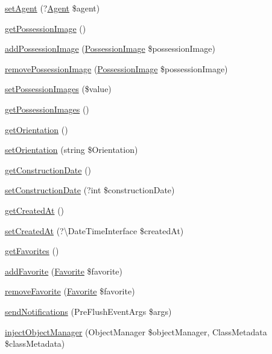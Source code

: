 \begin{DoxyCompactItemize}
\mbox{\hyperlink{class_app_1_1_entity_1_1_possession_a07e2e618472a00aaca5d813ee52abdac}{set\+Agent}} (?\mbox{\hyperlink{class_app_1_1_entity_1_1_agent}{Agent}} \$agent)
\item 
\mbox{\hyperlink{class_app_1_1_entity_1_1_possession_a9862c73c192fcf2032704752a1bfaccf}{get\+Possession\+Image}} ()
\item 
\mbox{\hyperlink{class_app_1_1_entity_1_1_possession_aeebbcaa3f823eb078d8a3f70082eb686}{add\+Possession\+Image}} (\mbox{\hyperlink{class_app_1_1_entity_1_1_possession_image}{Possession\+Image}} \$possession\+Image)
\item 
\mbox{\hyperlink{class_app_1_1_entity_1_1_possession_a61c52551493a4e8ae6bd5a11b44bdb65}{remove\+Possession\+Image}} (\mbox{\hyperlink{class_app_1_1_entity_1_1_possession_image}{Possession\+Image}} \$possession\+Image)
\item 
\mbox{\hyperlink{class_app_1_1_entity_1_1_possession_a4adfc8fe6a8861e0d2eb25c0388649fc}{set\+Possession\+Images}} (\$value)
\item 
\mbox{\hyperlink{class_app_1_1_entity_1_1_possession_a7643a946121fb0010af6a6d175575e49}{get\+Possession\+Images}} ()
\item 
\mbox{\hyperlink{class_app_1_1_entity_1_1_possession_a173749a621180fd9278040151c453038}{get\+Orientation}} ()
\item 
\mbox{\hyperlink{class_app_1_1_entity_1_1_possession_a7605d509e6a0d02178adc1c00b059215}{set\+Orientation}} (string \$Orientation)
\item 
\mbox{\hyperlink{class_app_1_1_entity_1_1_possession_a3a079c2281624581ab697a07c885c23a}{get\+Construction\+Date}} ()
\item 
\mbox{\hyperlink{class_app_1_1_entity_1_1_possession_a8d5e090a9e8006d10ab329e7021f2d78}{set\+Construction\+Date}} (?int \$construction\+Date)
\item 
\mbox{\hyperlink{class_app_1_1_entity_1_1_possession_a0f0455d4aafe27d1b0720c3bcfff2847}{get\+Created\+At}} ()
\item 
\mbox{\hyperlink{class_app_1_1_entity_1_1_possession_a22e870fed7fbb2911e3b9bece07dc78d}{set\+Created\+At}} (?\textbackslash{}Date\+Time\+Interface \$created\+At)
\item 
\mbox{\hyperlink{class_app_1_1_entity_1_1_possession_a645f4955cea1e0f521355b8128dad326}{get\+Favorites}} ()
\item 
\mbox{\hyperlink{class_app_1_1_entity_1_1_possession_a615e5ec7b500b8e4ccfb8a2c32d9f8e8}{add\+Favorite}} (\mbox{\hyperlink{class_app_1_1_entity_1_1_favorite}{Favorite}} \$favorite)
\item 
\mbox{\hyperlink{class_app_1_1_entity_1_1_possession_af7ddb0058fa8b93c95254b1435a34f27}{remove\+Favorite}} (\mbox{\hyperlink{class_app_1_1_entity_1_1_favorite}{Favorite}} \$favorite)
\item 
\mbox{\hyperlink{class_app_1_1_entity_1_1_possession_a2ad56d36f4644ab5c0e4c28470a2ea9b}{send\+Notifications}} (Pre\+Flush\+Event\+Args \$args)
\item 
\mbox{\hyperlink{class_app_1_1_entity_1_1_possession_a658c92f90d5bfde790746ac7b139869d}{inject\+Object\+Manager}} (Object\+Manager \$object\+Manager, Class\+Metadata \$class\+Metadata)
\end{DoxyCompactItemize}
